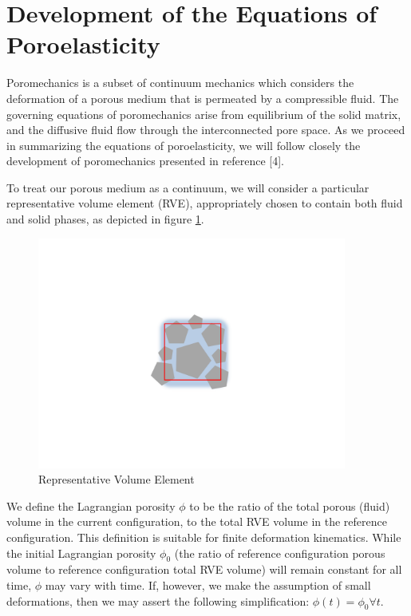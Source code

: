 \documentclass[11pt]{article} %
\begin{document}
\section{Development of the Equations of Poroelasticity}

Poromechanics is a subset of continuum mechanics which considers the deformation of a porous medium that is permeated by a compressible fluid. The governing equations of poromechanics arise from equilibrium of the solid matrix, and the diffusive fluid flow through the interconnected pore space. As we proceed in summarizing the equations of poroelasticity, we will follow closely the development of poromechanics presented in reference [4].

To treat our porous medium as a continuum, we will consider a particular representative volume element (RVE), appropriately chosen to contain both fluid and solid phases, as depicted in figure \ref{fig:RVE}.

\begin{figure} [!ht]
	\centering
	\includegraphics[width = 4.0in,trim=180 180 180 180,clip=true]{RVE_fig.pdf}
	\caption{Representative Volume Element}
	\label{fig:RVE}
\end{figure}

We define the Lagrangian porosity $\phi$ to be the ratio of the total porous (fluid) volume in the current configuration, to the total RVE volume in the reference configuration. This definition is suitable for finite deformation kinematics. While the initial Lagrangian porosity $\phi_0$ (the ratio of reference configuration porous volume to reference configuration total RVE volume) will remain constant for all time, $\phi$ may vary with time. If, however, we make the assumption of small deformations, then we may assert the following simplification: $\phi(t) = \phi_0 \forall t$.
\end{document}
